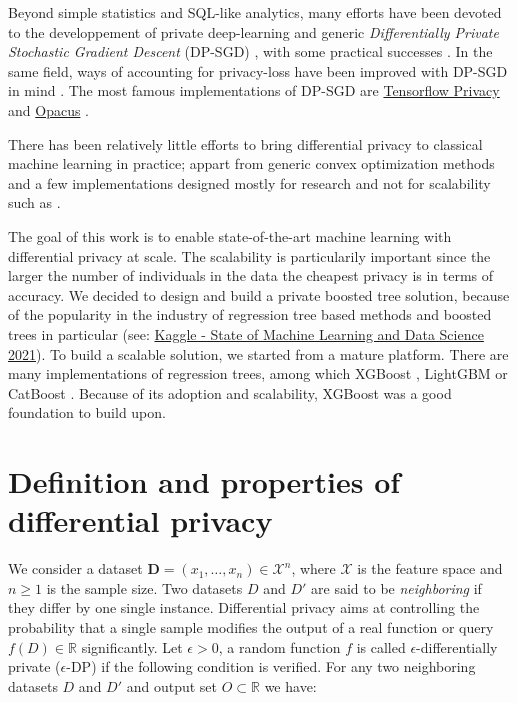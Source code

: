 \documentclass{article}
\theoremstyle{definition}
\begin{document}
Beyond simple statistics and SQL-like analytics, many efforts have been devoted to the developpement of
private deep-learning and generic \emph{Differentially Private Stochastic Gradient Descent} (DP-SGD)
\cite{abadi2016deep, papernot2018scalable, kairouz2021practical}, with some practical successes \cite{mcmahan2017learning}.
In the same field, ways of accounting for privacy-loss have been improved with DP-SGD in mind \cite{mironov2017renyi, bu2020deep}.
The most famous implementations of DP-SGD are \href{https://github.com/tensorflow/privacy}{Tensorflow Privacy} \cite{mcmahan2018general}
and \href{https://github.com/pytorch/opacus}{Opacus} \cite{opacus}.

There has been relatively little efforts to bring differential privacy to classical machine learning in practice;
appart from generic convex optimization methods \cite{wu2017bolt, iyengar2019towards} and a few implementations
designed mostly for research and not for scalability such as \cite{diffprivlib}.

The goal of this work is to enable state-of-the-art machine learning with differential privacy at scale.
The scalability is particularily important since the larger the number of individuals in the data the cheapest privacy is
in terms of accuracy. We decided to design and build a private boosted tree solution, because of the popularity in the industry of
regression tree based methods \cite{wu2008top} and boosted trees in particular (see:
\href{https://storage.googleapis.com/kaggle-media/surveys/Kaggle's\%20State\%20of\%20Machine\%20Learning\%20and\%20Data\%20Science\%202021.pdf}{Kaggle - State of Machine Learning and Data Science 2021}).
To build a scalable solution, we started from a mature platform.
There are many implementations of regression trees, among which XGBoost \cite{chen2016xgboost},
LightGBM \cite{ke2017lightgbm} or CatBoost \cite{prokhorenkova2017catboost}.
Because of its adoption and scalability, XGBoost was a good foundation to build upon.

\section{Definition and properties of differential privacy}

We consider a dataset $\mathbf{D} = (x_1,\dots,x_n)\in \mathcal{X}^n$, where $\mathcal{X}$ is the feature space and $n\geq 1$ is the sample size. 
Two datasets $D$ and $D'$ are said to be \textit{neighboring} if they differ by one single instance. Differential privacy aims at controlling the probability that a 
single sample modifies the output of a real function or query $f(D) \in \mathbb{R}$ significantly. Let $\epsilon > 0$, a random function $f$ is called $\epsilon$-differentially private 
($\epsilon$-DP) if the following condition is verified. For any two neighboring datasets $D$ and $D'$ and output set $O \subset \mathbb{R}$  we have:
\end{document}
